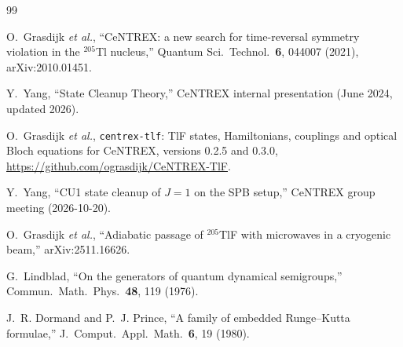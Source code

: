 \documentclass[11pt,a4paper,oneside]{report}
\newcommand{\code}[1]{\texttt{#1}}
\begin{document}
\begin{thebibliography}{99}

O.~Grasdijk \emph{et al.}, ``CeNTREX: a new search for time-reversal symmetry violation in
the $^{205}$Tl nucleus,'' Quantum Sci.\ Technol.\ \textbf{6}, 044007 (2021),
arXiv:2010.01451.

Y.~Yang, ``State Cleanup Theory,'' CeNTREX internal presentation (June 2024, updated 2026).

O.~Grasdijk \emph{et al.}, \code{centrex-tlf}: TlF states, Hamiltonians, couplings and
optical Bloch equations for CeNTREX, versions 0.2.5 and 0.3.0,
\url{https://github.com/ograsdijk/CeNTREX-TlF}.

Y.~Yang, ``CU1 state cleanup of $J=1$ on the SPB setup,'' CeNTREX group meeting (2026-10-20).

O.~Grasdijk \emph{et al.}, ``Adiabatic passage of $^{205}$TlF with microwaves in a cryogenic
beam,'' arXiv:2511.16626.

G.~Lindblad, ``On the generators of quantum dynamical semigroups,''
Commun.\ Math.\ Phys.\ \textbf{48}, 119 (1976).

J.~R. Dormand and P.~J. Prince, ``A family of embedded Runge--Kutta formulae,''
J.\ Comput.\ Appl.\ Math.\ \textbf{6}, 19 (1980).

\end{thebibliography}
\end{document}
